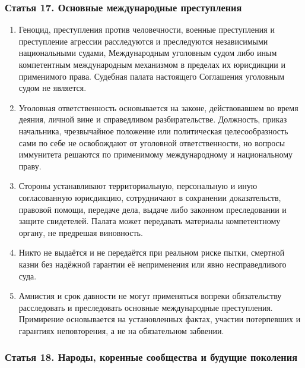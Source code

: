 \documentclass[
  russian,
  11pt,
  a4paper,
]{article}
\providecommand{\tightlist}{%
  \setlength{\itemsep}{0pt}\setlength{\parskip}{0pt}}
\begin{document}
\subsubsection{Статья 17. Основные международные
преступления}\label{ux441ux442ux430ux442ux44cux44f-17-ux43eux441ux43dux43eux432ux43dux44bux435-ux43cux435ux436ux434ux443ux43dux430ux440ux43eux434ux43dux44bux435-ux43fux440ux435ux441ux442ux443ux43fux43bux435ux43dux438ux44f}

\begin{enumerate}
\def\labelenumi{\arabic{enumi}.}
\tightlist
\item
  Геноцид, преступления против человечности, военные преступления и
  преступление агрессии расследуются и преследуются независимыми
  национальными судами, Международным уголовным судом либо иным
  компетентным международным механизмом в пределах их юрисдикции и
  применимого права. Судебная палата настоящего Соглашения уголовным
  судом не является.
\item
  Уголовная ответственность основывается на законе, действовавшем во
  время деяния, личной вине и справедливом разбирательстве. Должность,
  приказ начальника, чрезвычайное положение или политическая
  целесообразность сами по себе не освобождают от уголовной
  ответственности, но вопросы иммунитета решаются по применимому
  международному и национальному праву.
\item
  Стороны устанавливают территориальную, персональную и иную
  согласованную юрисдикцию, сотрудничают в сохранении доказательств,
  правовой помощи, передаче дела, выдаче либо законном преследовании и
  защите свидетелей. Палата может передавать материалы компетентному
  органу, не предрешая виновность.
\item
  Никто не выдаётся и не передаётся при реальном риске пытки, смертной
  казни без надёжной гарантии её неприменения или явно несправедливого
  суда.
\item
  Амнистия и срок давности не могут применяться вопреки обязательству
  расследовать и преследовать основные международные преступления.
  Примирение основывается на установленных фактах, участии потерпевших и
  гарантиях неповторения, а не на обязательном забвении.
\end{enumerate}

\subsubsection{Статья 18. Народы, коренные сообщества и будущие
поколения}\label{ux441ux442ux430ux442ux44cux44f-18-ux43dux430ux440ux43eux434ux44b-ux43aux43eux440ux435ux43dux43dux44bux435-ux441ux43eux43eux431ux449ux435ux441ux442ux432ux430-ux438-ux431ux443ux434ux443ux449ux438ux435-ux43fux43eux43aux43eux43bux435ux43dux438ux44f}
\end{document}
